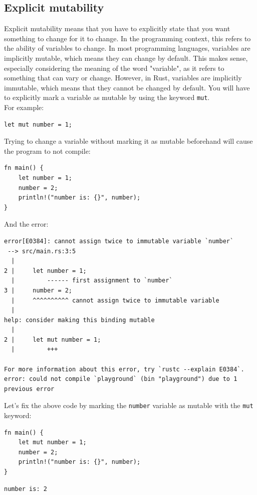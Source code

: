 \documentclass[11pt]{article}
\begin{document}
\subsection{Explicit mutability}
\label{sec:orgc63c1e8}
Explicit mutability means that you have to explicitly
state that you want something to change for it to change.
In the programming context, this refers to the ability
of variables to change. In most programming languages,
variables are implicitly mutable, which means they
can change by default. This makes sense, especially
considering the meaning of the word "variable",
as it refers to something that can vary or change.
However, in Rust, variables are implicitly immutable,
which means that they cannot be changed by default.
You will have to explicitly mark a variable as
mutable by using the keyword \texttt{mut}.  \\

For example:
\begin{verbatim}
let mut number = 1;
\end{verbatim}

Trying to change a variable without marking it
as mutable beforehand will cause the program
to not compile:
\begin{verbatim}
fn main() {
    let number = 1;
    number = 2;
    println!("number is: {}", number);
}
\end{verbatim}

 \newpage

And the error:
\begin{verbatim}
error[E0384]: cannot assign twice to immutable variable `number`
 --> src/main.rs:3:5
  |
2 |     let number = 1;
  |         ------ first assignment to `number`
3 |     number = 2;
  |     ^^^^^^^^^^ cannot assign twice to immutable variable
  |
help: consider making this binding mutable
  |
2 |     let mut number = 1;
  |         +++

For more information about this error, try `rustc --explain E0384`.
error: could not compile `playground` (bin "playground") due to 1 previous error
\end{verbatim}

Let's fix the above code by marking the
\texttt{number} variable as mutable with the \texttt{mut}
keyword:
\begin{verbatim}
fn main() {
    let mut number = 1;
    number = 2;
    println!("number is: {}", number);
}
\end{verbatim}

\begin{verbatim}
number is: 2
\end{verbatim}
\end{document}
